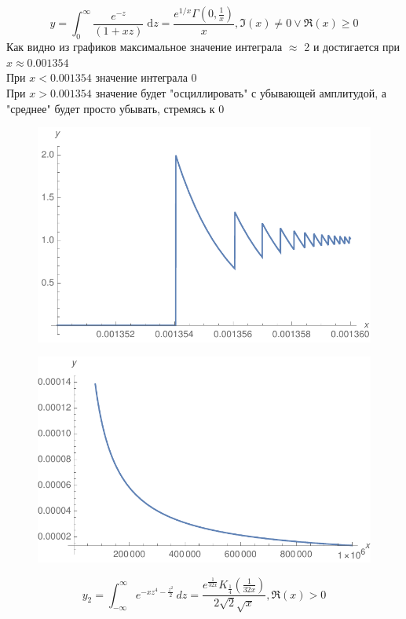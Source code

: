 \documentclass[10pt,a4paper]{article}
\begin{document}
\begin{equation}
y = \int_0^\infty \frac{e^{-z}}{(1 + x z)}\;\mathrm{d}z = \frac{e^{1/x} \Gamma \left(0,\frac{1}{x}\right)}{x},\Im(x)\neq 0\lor \Re(x)\geq 0
\end{equation}
Как видно из графиков максимальное значение интеграла $\approx$ 2 и достигается при $x\approx 0.001354$\\
При $x<0.001354$ значение интеграла 0\\
При $x>0.001354$ значение будет "осциллировать" с убывающей амплитудой, а "среднее" будет просто убывать, стремясь к 0 
\begin{figure}[h]
\includegraphics{gr1}
\end{figure}

\begin{figure}[h]
\includegraphics{gr2}
\end{figure}

\begin{equation}
y_2 = \int_{-\infty }^{\infty } e^{-x z^4-\frac{z^2}{2}} \, dz = \frac{e^{\frac{1}{32 x}} K_{\frac{1}{4}}\left(\frac{1}{32 x}\right)}{2 \sqrt{2} \sqrt{x}},\Re(x)>0
\end{equation} 
\end{document}
